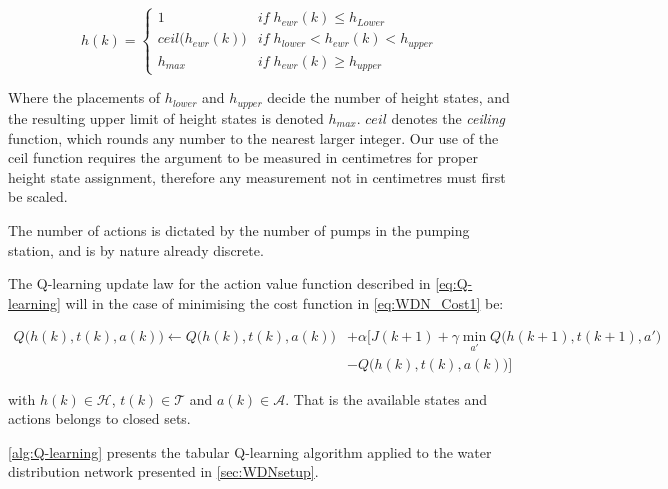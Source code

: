 \begin{equation} \label{eq:HeightStates}
	h(k)=\begin{cases}
		1 & if \; h_{ewr}(k) \leq h_{Lower} \\
		ceil\bigg(h_{ewr}(k)\bigg) & if \; h_{lower} < h_{ewr}(k) <h_{upper} \\
		h_{max} & if \; h_{ewr}(k) \geq h_{upper} 
	\end{cases}
\end{equation}


Where the placements of $ h_{lower} $ and $ h_{upper} $ decide the number of height states, and the resulting upper limit of height states is denoted $ h_{max} $. $ ceil $ denotes the \textit{ceiling} function, which rounds any number to the nearest larger integer. Our use of the ceil function requires the argument to be measured in centimetres for proper height state assignment, therefore any measurement not in centimetres must first be scaled.

The number of actions is dictated by the number of pumps in the pumping station, and is by nature already discrete.

The Q-learning update law for the action value function described in \cref{eq:Q-learning} will in the case of minimising the cost function in \cref{eq:WDN_Cost1} be:

\begin{equation}\label{eq:Q-learningMin}
	\begin{split}
		Q\bigg(h(k),t(k),a(k)\bigg)\leftarrow Q\bigg(h(k),t(k),a(k)\bigg)&+\alpha \bigg[J(k+1)	+\gamma \min_{a'} Q\bigg(h(k+1),t(k+1),a'\bigg)\\
		&-Q\bigg(h(k),t(k),a(k)\bigg)\bigg]
	\end{split}
\end{equation}

with $ h(k) \in \mathcal{H} $, $ t(k) \in \mathcal{T}$ and $ a(k) \in \mathcal{A} $. That is the available states and actions belongs to closed sets. 

\cref{alg:Q-learning} presents the tabular Q-learning algorithm applied to the water distribution network presented in \cref{sec:WDNsetup}.


